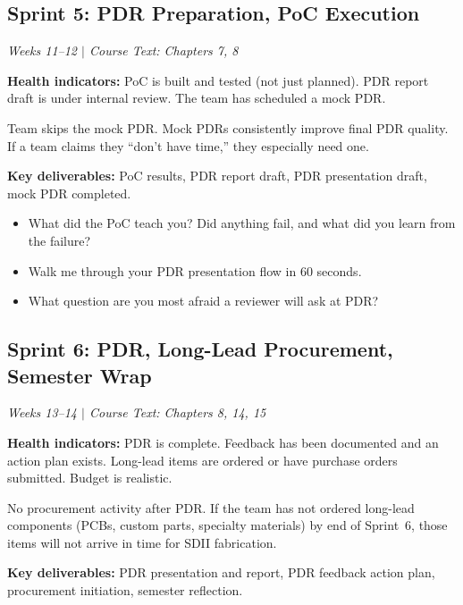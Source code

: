 \subsection{Sprint 5: PDR Preparation, PoC Execution}
\textit{Weeks 11--12 $|$ Course Text: Chapters 7, 8}

\textbf{Health indicators:} PoC is built and tested (not just planned). PDR report draft is under internal review. The team has scheduled a mock PDR.

\begin{redflag}
Team skips the mock PDR. Mock PDRs consistently improve final PDR quality. If a team claims they ``don't have time,'' they especially need one.
\end{redflag}

\textbf{Key deliverables:} PoC results, PDR report draft, PDR presentation draft, mock PDR completed.

\begin{paquestion}
\begin{itemize}[nosep,leftmargin=1.5em]
\item What did the PoC teach you? Did anything fail, and what did you learn from the failure?
\item Walk me through your PDR presentation flow in 60 seconds.
\item What question are you most afraid a reviewer will ask at PDR?
\end{itemize}
\end{paquestion}


\subsection{Sprint 6: PDR, Long-Lead Procurement, Semester Wrap}
\textit{Weeks 13--14 $|$ Course Text: Chapters 8, 14, 15}

\textbf{Health indicators:} PDR is complete. Feedback has been documented and an action plan exists. Long-lead items are ordered or have purchase orders submitted. Budget is realistic.

\begin{redflag}
No procurement activity after PDR. If the team has not ordered long-lead components (PCBs, custom parts, specialty materials) by end of Sprint~6, those items will not arrive in time for SDII fabrication.
\end{redflag}

\textbf{Key deliverables:} PDR presentation and report, PDR feedback action plan, procurement initiation, semester reflection.

